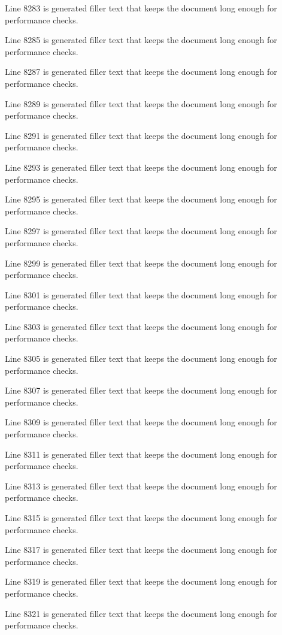 Line 8283 is generated filler text that keeps the document long enough for performance checks.

Line 8285 is generated filler text that keeps the document long enough for performance checks.

Line 8287 is generated filler text that keeps the document long enough for performance checks.

Line 8289 is generated filler text that keeps the document long enough for performance checks.

Line 8291 is generated filler text that keeps the document long enough for performance checks.

Line 8293 is generated filler text that keeps the document long enough for performance checks.

Line 8295 is generated filler text that keeps the document long enough for performance checks.

Line 8297 is generated filler text that keeps the document long enough for performance checks.

Line 8299 is generated filler text that keeps the document long enough for performance checks.

Line 8301 is generated filler text that keeps the document long enough for performance checks.

Line 8303 is generated filler text that keeps the document long enough for performance checks.

Line 8305 is generated filler text that keeps the document long enough for performance checks.

Line 8307 is generated filler text that keeps the document long enough for performance checks.

Line 8309 is generated filler text that keeps the document long enough for performance checks.

Line 8311 is generated filler text that keeps the document long enough for performance checks.

Line 8313 is generated filler text that keeps the document long enough for performance checks.

Line 8315 is generated filler text that keeps the document long enough for performance checks.

Line 8317 is generated filler text that keeps the document long enough for performance checks.

Line 8319 is generated filler text that keeps the document long enough for performance checks.

Line 8321 is generated filler text that keeps the document long enough for performance checks.

